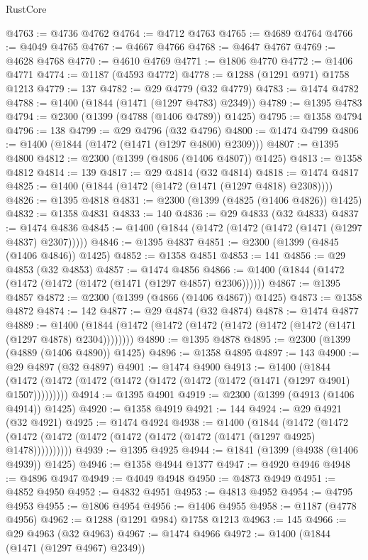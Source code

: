\begin{lexlean}{RustCore}
\begin{coremodule}
@4763 := @4736 @4762
@4764 := @4712 @4763
@4765 := @4689 @4764
@4766 := @4049 @4765
@4767 := @4667 @4766
@4768 := @4647 @4767
@4769 := @4628 @4768
@4770 := @4610 @4769
@4771 := @1806 @4770
@4772 := @1406 @4771
@4774 := @1187 (@4593 @4772)
@4778 := @1288 (@1291 @971) @1758 @1213
@4779 := 137
@4782 := @29 @4779 (@32 @4779)
@4783 := @1474 @4782
@4788 := @1400 (@1844 (@1471 (@1297 @4783) @2349))
@4789 := @1395 @4783
@4794 := @2300 (@1399 (@4788 (@1406 @4789)) @1425)
@4795 := @1358 @4794
@4796 := 138
@4799 := @29 @4796 (@32 @4796)
@4800 := @1474 @4799
@4806 := @1400 (@1844 (@1472 (@1471 (@1297 @4800) @2309)))
@4807 := @1395 @4800
@4812 := @2300 (@1399 (@4806 (@1406 @4807)) @1425)
@4813 := @1358 @4812
@4814 := 139
@4817 := @29 @4814 (@32 @4814)
@4818 := @1474 @4817
@4825 := @1400 (@1844 (@1472 (@1472 (@1471 (@1297 @4818) @2308))))
@4826 := @1395 @4818
@4831 := @2300 (@1399 (@4825 (@1406 @4826)) @1425)
@4832 := @1358 @4831
@4833 := 140
@4836 := @29 @4833 (@32 @4833)
@4837 := @1474 @4836
@4845 := @1400 (@1844 (@1472 (@1472 (@1472 (@1471 (@1297 @4837) @2307)))))
@4846 := @1395 @4837
@4851 := @2300 (@1399 (@4845 (@1406 @4846)) @1425)
@4852 := @1358 @4851
@4853 := 141
@4856 := @29 @4853 (@32 @4853)
@4857 := @1474 @4856
@4866 := @1400 (@1844 (@1472 (@1472 (@1472 (@1472 (@1471 (@1297 @4857) @2306))))))
@4867 := @1395 @4857
@4872 := @2300 (@1399 (@4866 (@1406 @4867)) @1425)
@4873 := @1358 @4872
@4874 := 142
@4877 := @29 @4874 (@32 @4874)
@4878 := @1474 @4877
@4889 := @1400 (@1844 (@1472 (@1472 (@1472 (@1472 (@1472 (@1472 (@1471 (@1297 @4878) @2304))))))))
@4890 := @1395 @4878
@4895 := @2300 (@1399 (@4889 (@1406 @4890)) @1425)
@4896 := @1358 @4895
@4897 := 143
@4900 := @29 @4897 (@32 @4897)
@4901 := @1474 @4900
@4913 := @1400
    (@1844 (@1472 (@1472 (@1472 (@1472 (@1472 (@1472 (@1472 (@1471 (@1297 @4901) @1507)))))))))
@4914 := @1395 @4901
@4919 := @2300 (@1399 (@4913 (@1406 @4914)) @1425)
@4920 := @1358 @4919
@4921 := 144
@4924 := @29 @4921 (@32 @4921)
@4925 := @1474 @4924
@4938 := @1400
    (@1844
      (@1472 (@1472 (@1472 (@1472 (@1472 (@1472 (@1472 (@1472 (@1471 (@1297 @4925) @1478))))))))))
@4939 := @1395 @4925
@4944 := @1841 (@1399 (@4938 (@1406 @4939)) @1425)
@4946 := @1358 @4944 @1377
@4947 := @4920 @4946
@4948 := @4896 @4947
@4949 := @4049 @4948
@4950 := @4873 @4949
@4951 := @4852 @4950
@4952 := @4832 @4951
@4953 := @4813 @4952
@4954 := @4795 @4953
@4955 := @1806 @4954
@4956 := @1406 @4955
@4958 := @1187 (@4778 @4956)
@4962 := @1288 (@1291 @984) @1758 @1213
@4963 := 145
@4966 := @29 @4963 (@32 @4963)
@4967 := @1474 @4966
@4972 := @1400 (@1844 (@1471 (@1297 @4967) @2349))

\end{coremodule}
\end{lexlean}
